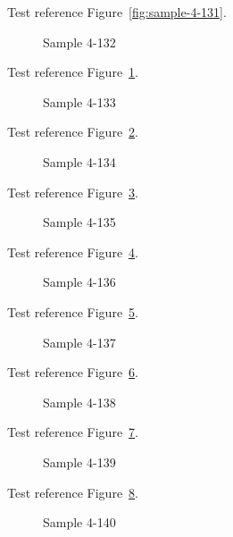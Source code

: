 Test reference Figure~\ref{fig:sample-4-131}.

\begin{figure}[tbhp]
\caption{Sample 4-132}
\label{fig:sample-4-132}
\end{figure}

Test reference Figure~\ref{fig:sample-4-132}.

\begin{figure}[tbhp]
\caption{Sample 4-133}
\label{fig:sample-4-133}
\end{figure}

Test reference Figure~\ref{fig:sample-4-133}.

\begin{figure}[tbhp]
\caption{Sample 4-134}
\label{fig:sample-4-134}
\end{figure}

Test reference Figure~\ref{fig:sample-4-134}.

\begin{figure}[tbhp]
\caption{Sample 4-135}
\label{fig:sample-4-135}
\end{figure}

Test reference Figure~\ref{fig:sample-4-135}.

\begin{figure}[tbhp]
\caption{Sample 4-136}
\label{fig:sample-4-136}
\end{figure}

Test reference Figure~\ref{fig:sample-4-136}.

\begin{figure}[tbhp]
\caption{Sample 4-137}
\label{fig:sample-4-137}
\end{figure}

Test reference Figure~\ref{fig:sample-4-137}.

\begin{figure}[tbhp]
\caption{Sample 4-138}
\label{fig:sample-4-138}
\end{figure}

Test reference Figure~\ref{fig:sample-4-138}.

\begin{figure}[tbhp]
\caption{Sample 4-139}
\label{fig:sample-4-139}
\end{figure}

Test reference Figure~\ref{fig:sample-4-139}.

\begin{figure}[tbhp]
\caption{Sample 4-140}
\label{fig:sample-4-140}
\end{figure}

